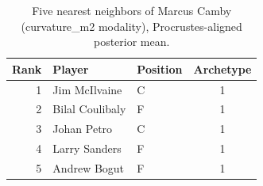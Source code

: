 \begin{table}[htbp]
  \centering\small
  \begin{tabular}{rllc}
    \toprule
    Rank & Player & Position & Archetype \\
    \midrule
    1 & Jim McIlvaine & C & 1 \\
    2 & Bilal Coulibaly & F & 1 \\
    3 & Johan Petro & C & 1 \\
    4 & Larry Sanders & F & 1 \\
    5 & Andrew Bogut & F & 1 \\
    \bottomrule
  \end{tabular}
  \caption{Five nearest neighbors of Marcus Camby (curvature_m2 modality), Procrustes-aligned posterior mean.}
  \label{tab:Marcus_Camby_neighbors_curvature_m2}
\end{table}

